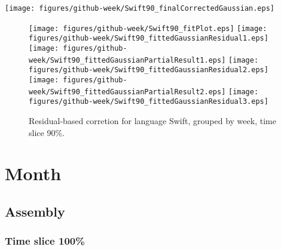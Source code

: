 \begin{center}
{\texttt{[image: figures/github-week/Swift90\_finalCorrectedGaussian.eps]}}
\end{center}

\FloatBarrier

\begin{figure}[t]
\centering
{}
{\texttt{[image: figures/github-week/Swift90\_fitPlot.eps]}}
{\texttt{[image: figures/github-week/Swift90\_fittedGaussianResidual1.eps]}}
{\texttt{[image: figures/github-week/Swift90\_fittedGaussianPartialResult1.eps]}}
{\texttt{[image: figures/github-week/Swift90\_fittedGaussianResidual2.eps]}}
{\texttt{[image: figures/github-week/Swift90\_fittedGaussianPartialResult2.eps]}}
{\texttt{[image: figures/github-week/Swift90\_fittedGaussianResidual3.eps]}}
\caption{Residual-based corretion for language Swift, grouped by week, time slice 90\%.}
\end{figure}


\FloatBarrier


\section{Month}

\subsection{Assembly}

\subsubsection{Time slice 100\%}

